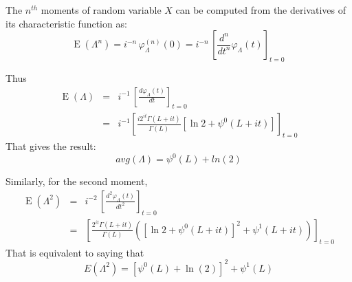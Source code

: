 \documentclass[journal,12pt,draftcls,onecolumn]{IEEEtran}
\begin{document}
The $n^{th}$ moments of random variable $X$ can be computed from the derivatives of its characteristic function as:
\begin{equation}
\operatorname{E}\left(\Lambda^n\right) = i^{-n}\, \varphi_\Lambda^{(n)}(0)
  = i^{-n}\, \left[\frac{d^n}{dt^n} \varphi_\Lambda(t)\right]_{t=0} \,\!
\end{equation}

Thus
\begin{eqnarray*}
 \operatorname{E}\left(\Lambda\right) &=& i^{-1}\, \left[\frac{d\varphi_\Lambda(t)}{dt} \right]_{t=0} \,\! \\
  &=& i^{-1} \left[ \frac{i 2^{it} \Gamma(L+it)}{\Gamma(L)} \left[ \ln{2} + \psi^0(L+it) \right] \right]_{t=0}
\end{eqnarray*}
That gives the result:
\begin{equation}
  avg(\Lambda) = \psi^0(L) + ln(2)
\end{equation}

Similarly, for the second moment,
\begin{eqnarray*}
 \operatorname{E}\left(\Lambda^2\right) &=& i^{-2}\, \left[\frac{d^2\varphi_\Lambda(t)}{dt^2} \right]_{t=0} \,\! \\
  &=& \left[ \frac{2^{it} \Gamma(L+it)}{\Gamma(L)} \left( \left[ \ln{2} + \psi^0(L+it) \right] ^ 2 + \psi^1(L+it) \right) \right]_{t=0}  
\end{eqnarray*}
That is equivalent to saying that
\begin{equation}
  E(\Lambda^2) = \left[ \psi^0(L)+\ln(2) \right]^2 + \psi^1(L)
\end{equation}
\end{document}
